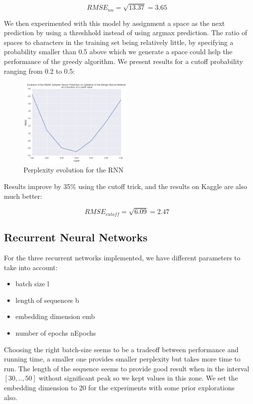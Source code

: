 \documentclass[11pt]{article}
\begin{document}
$$RMSE_{nn} = \sqrt{13.37} = 3.65$$

We then experimented with this model by assignment a space as the next prediction by using a threshhold instead of using argmax prediction. The ratio of spaces to characters in the training set being relatively little, by specifying a probability smaller than 0.5 above which we generate a space could help the performance of the greedy algorithm. We present results for a cutoff probability ranging from 0.2 to 0.5:

\begin{figure}[H]
\begin{center}
    \includegraphics[width=0.5\textwidth]{cutoff}
    \caption{Perplexity evolution for the RNN}
\end{center}
\end{figure}

Results improve by 35\% using the cutoff trick, and the results on Kaggle are also much better:

$$RMSE_{cutoff} = \sqrt{6.09} = 2.47$$
\subsection{Recurrent Neural Networks}

For the three recurrent networks implemented, we have different parameters to take into account: 
\begin{itemize}
	\item batch size l
	\item length of sequences b
	\item embedding dimension emb
	\item number of epochs nEpochs
\end{itemize}

Choosing the right batch-size seems to be a tradeoff between performance and running time, a smaller one provides smaller perplexity but takes more time to run. The length of the sequence seems to provide good result when in the interval $[30,..,50]$ without significant peak so we kept values in this zone. We set the embedding dimension to 20 for the experiments with some prior explorations also.
\end{document}
